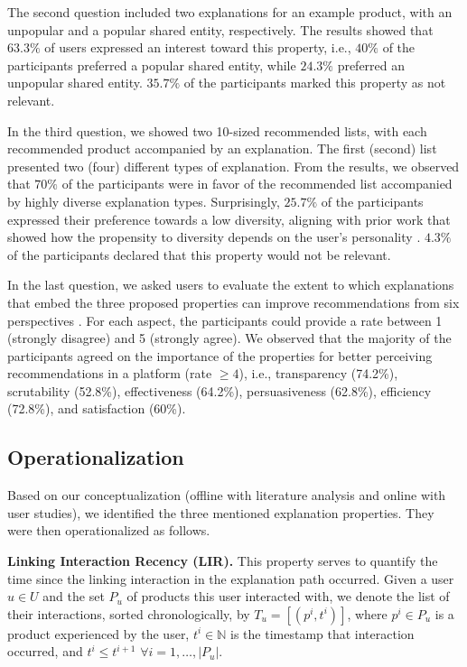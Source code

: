 \documentclass[sigconf]{acmart}
\begin{document}
The second question included two explanations for an example product, with an unpopular and a popular shared entity, respectively. 
The results showed that $63.3\%$ of users expressed an interest toward this property, i.e., $40\%$ of the participants preferred a popular shared entity, while $24.3\%$ preferred an unpopular shared entity.
$35.7\%$ of the participants marked this property as not relevant. 

In the third question, we showed two 10-sized recommended lists, with each recommended product accompanied by an explanation.
The first (second) list presented two (four) different types of explanation.  
From the results, we observed that $70\%$ of the participants were in favor of the recommended list accompanied by highly diverse explanation types. 
Surprisingly, $25.7\%$ of the participants expressed their preference towards a low diversity, {\color{black} aligning with prior work that showed how the propensity to diversity depends on the user's personality \cite{10.1145/2468356.2468505}}.
$4.3\%$ of the participants declared that this property would not be relevant.  

In the last question, we asked users to evaluate the extent to which explanations that embed the three proposed properties can improve recommendations from six perspectives \cite{Tintarev2007}. 
For each aspect, the participants could provide a rate between 1 (strongly disagree) and 5 (strongly agree). 
We observed that the majority of the participants agreed on the importance of the properties for better perceiving recommendations in a platform (rate $\ge 4$), i.e., transparency (74.2\%), scrutability (52.8\%), effectiveness (64.2\%), persuasiveness (62.8\%), efficiency (72.8\%), and satisfaction (60\%). 

\subsection{Operationalization}\label{subsec:operationalization}
Based on our conceptualization (offline with literature analysis and online with user studies), we identified the three mentioned explanation properties. They were then operationalized as follows. 

\vspace{1mm}\noindent\textbf{Linking Interaction Recency (LIR).} 
This property serves to quantify the time since the linking interaction in the explanation path occurred. 
Given a user $u \in U$ and the set $P_u$ of products this user interacted with, we denote the list of their interactions, sorted chronologically, by $T_u = [(p^i, t^i)]$, where $p^i \in P_u$ is a product experienced by the user, $t^i \in \mathbb N$ is the timestamp that interaction occurred, and $t^i \leq t^{i+1}$ $\forall i = 1, \dots, |P_u|$. 
\end{document}
